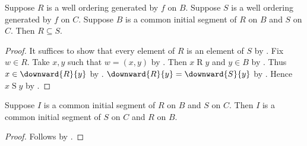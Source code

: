 \begin{lemma}\label{common_initial_segment_relation_subseteq}
    Suppose $R$ is a well ordering generated by $f$ on $B$.
    Suppose $S$ is a well ordering generated by $f$ on $C$.
    Suppose $B$ is a common initial segment of $R$ on $B$ and $S$ on $C$.
    Then $R\subseteq S$.
\end{lemma}
\begin{proof}
    It suffices to show that every element of $R$ is an element of $S$ by .
    Fix $w\in R$.
    Take $x,y$ such that $w=(x,y)$ by .
    Then $x\mathrel{R}y$ and $y\in B$ by
        .
    Thus $x\in\downward{R}{y}$ by .
    $\downward{R}{y}=\downward{S}{y}$ by .
    Hence $x\mathrel{S}y$ by .
\end{proof}

\begin{lemma}\label{common_initial_segment_symmetric}
    Suppose $I$ is a common initial segment of $R$ on $B$ and $S$ on $C$.
    Then $I$ is a common initial segment of $S$ on $C$ and $R$ on $B$.
\end{lemma}
\begin{proof}
    Follows by .
\end{proof}

